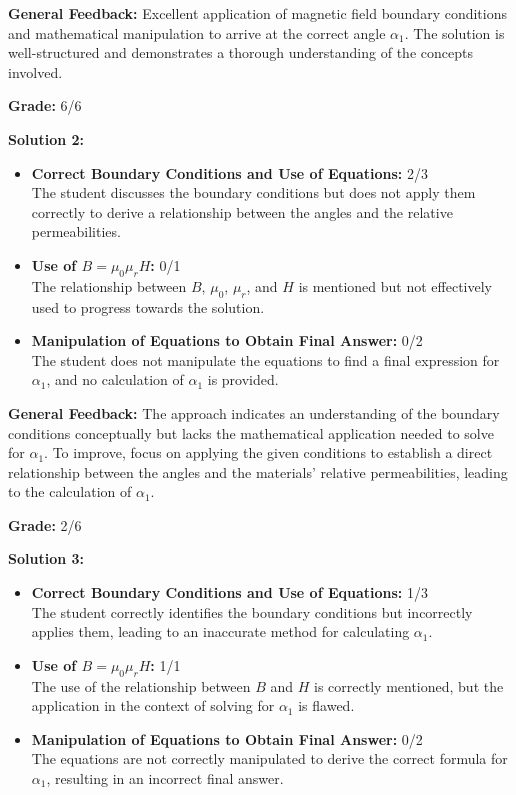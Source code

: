 \documentclass[a4paper,11pt]{article}
\begin{document}
\textbf{General Feedback:}
Excellent application of magnetic field boundary conditions and mathematical manipulation to arrive at the correct angle \(\alpha_1\). The solution is well-structured and demonstrates a thorough understanding of the concepts involved.

\textbf{Grade:} 6/6

\hrulefill

\textbf{Solution 2:}
\begin{itemize}
    \item \textbf{Correct Boundary Conditions and Use of Equations:} 2/3 \\
    The student discusses the boundary conditions but does not apply them correctly to derive a relationship between the angles and the relative permeabilities.
    \item \textbf{Use of \(B = \mu_0 \mu_r H\):} 0/1 \\
    The relationship between \(B\), \(\mu_0\), \(\mu_r\), and \(H\) is mentioned but not effectively used to progress towards the solution.
    \item \textbf{Manipulation of Equations to Obtain Final Answer:} 0/2 \\
    The student does not manipulate the equations to find a final expression for \(\alpha_1\), and no calculation of \(\alpha_1\) is provided.
\end{itemize}

\textbf{General Feedback:}
The approach indicates an understanding of the boundary conditions conceptually but lacks the mathematical application needed to solve for \(\alpha_1\). To improve, focus on applying the given conditions to establish a direct relationship between the angles and the materials' relative permeabilities, leading to the calculation of \(\alpha_1\).

\textbf{Grade:} 2/6

\hrulefill

\textbf{Solution 3:}
\begin{itemize}
    \item \textbf{Correct Boundary Conditions and Use of Equations:} 1/3 \\
    The student correctly identifies the boundary conditions but incorrectly applies them, leading to an inaccurate method for calculating \(\alpha_1\).
    \item \textbf{Use of \(B = \mu_0 \mu_r H\):} 1/1 \\
    The use of the relationship between \(B\) and \(H\) is correctly mentioned, but the application in the context of solving for \(\alpha_1\) is flawed.
    \item \textbf{Manipulation of Equations to Obtain Final Answer:} 0/2 \\
    The equations are not correctly manipulated to derive the correct formula for \(\alpha_1\), resulting in an incorrect final answer.
\end{itemize}
\end{document}
